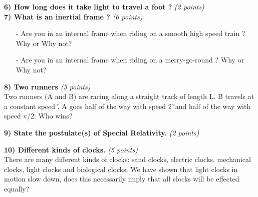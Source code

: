 \textbf{6) How long does it take light to travel a foot ?} \hfill \textit{(2 points)}\\


\clearpage
\textbf{7) What is an inertial frame ? } \hfill \textit{(6 points)}\\
\begin{itemize}
\item[-]{ Are you in an internal frame when riding on a smooth high speed train ? Why or Why not?}
\item[-]{ Are you in an internal frame when riding on a merry-go-round ? Why or Why not?}
\end{itemize}

\vspace*{0.25in}


\textbf{8) Two runners } \hfill \textit{(5 points)}\\

Two runners (A and B) are racing along a straight track of length L. B travels at a constant speed \v, A goes half of the way with speed 2\v\ and half of the way with speed v/2. Who wins?  

\vspace*{0.25in}

\textbf{9) State the postulate(s) of Special Relativity.} \hfill \textit{(2 points)}\\

\vspace*{0.25in}

\textbf{10) Different kinds of clocks. } \hfill \textit{(5 points)}\\

There are many different kinds of clocks: sand clocks, electric clocks, mechanical clocks, light clocks and biological clocks.
We have shown that  light clocks in motion slow down,  does this  necessarily imply that  all  clocks will be effected equally?



